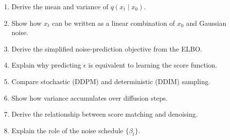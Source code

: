 \begin{enumerate}
    \item Derive the mean and variance of $q(x_t \mid x_0)$.

    \item Show how $x_t$ can be written as a linear combination of $x_0$ and Gaussian noise.

    \item Derive the simplified noise-prediction objective from the ELBO.

    \item Explain why predicting $\epsilon$ is equivalent to learning the score function.

    \item Compare stochastic (DDPM) and deterministic (DDIM) sampling.

    \item Show how variance accumulates over diffusion steps.

    \item Derive the relationship between score matching and denoising.

    \item Explain the role of the noise schedule $\{\beta_t\}$.
\end{enumerate}
